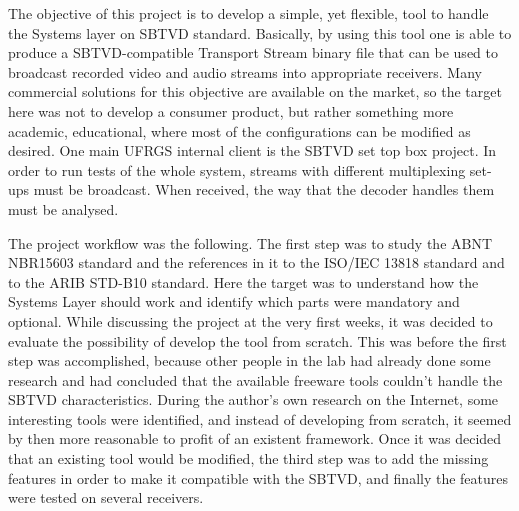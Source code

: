 \documentclass[
	12pt,				%
	openright,			%
	twoside,			%
	a4paper,			%
	brazil,
	french,				%
	english
	]{abntex2}
\begin{document}
The objective of this project is to develop a simple, yet flexible, tool to handle the Systems layer on SBTVD standard. Basically, by using this tool one is able to produce a SBTVD-compatible Transport Stream binary file that can be used to broadcast recorded video and audio streams into appropriate receivers. Many commercial solutions for this objective are available on the market, so the target here was not to develop a consumer product, but rather something more academic, educational, where most of the configurations can be modified as desired. One main UFRGS internal client is the SBTVD set top box project. In order to run tests of the whole system, streams with different multiplexing set-ups must be broadcast. When received, the way that the decoder handles them must be analysed.

The project workflow was the following. The first step was to study the ABNT NBR15603 standard and the references in it to the ISO/IEC 13818 standard and to the ARIB STD-B10 standard. Here the target was to understand how the Systems Layer should work and identify which parts were mandatory and optional. While discussing the project at the very first weeks, it was decided to evaluate the possibility of develop the tool from scratch. This was before the first step was accomplished, because other people in the lab had already done some research and had concluded that the available freeware tools couldn't handle the SBTVD characteristics. During the author's own research on the Internet, some interesting tools were identified, and instead of developing from scratch, it seemed by then more reasonable to profit of an existent framework. Once it was decided that an existing tool would be modified, the third step was to add the missing features in order to make it compatible with the SBTVD, and finally the features were tested on several receivers.

\end{document}
